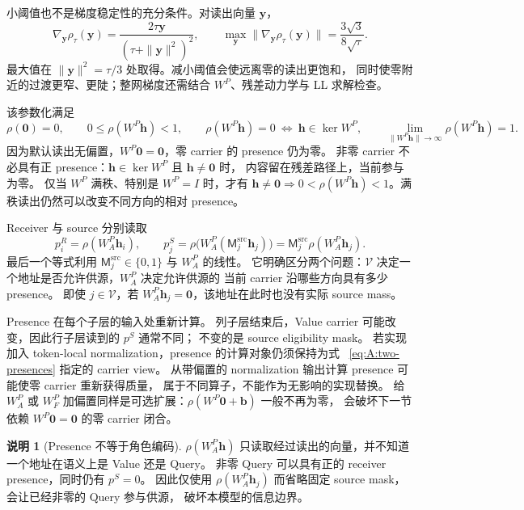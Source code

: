 \documentclass[11pt,UTF8,fontset=fandol]{ctexart}
\numberwithin{equation}{section}
\theoremstyle{definition}
\newtheorem{remark}[definition]{说明}
\newcommand{\Vset}{\mathcal V}
\begin{document}
小阈值也不是梯度稳定性的充分条件。对读出向量 $\bm y$，
\begin{equation}
 \nabla_{\bm y}\rho_\tau(\bm y)
 =\frac{2\tau\bm y}{(\tau+\|\bm y\|^2)^2},\qquad
 \max_{\bm y}\|\nabla_{\bm y}\rho_\tau(\bm y)\|
 =\frac{3\sqrt3}{8\sqrt\tau}.
 \label{v53:eq:presence-derivative-scale}
\end{equation}
最大值在 $\|\bm y\|^2=\tau/3$ 处取得。减小阈值会使远离零的读出更饱和，
同时使零附近的过渡更窄、更陡；整网梯度还需结合 $W^{P}$、残差动力学与 LL 求解检查。

该参数化满足
\begin{equation}
 \rho(\bm0)=0,
 \qquad
 0\le\rho(W^{P}\bm h)<1,
 \qquad
 \rho(W^{P}\bm h)=0\ \Longleftrightarrow\ \bm h\in\ker W^{P},
 \qquad
 \lim_{\|W^{P}\bm h\|\to\infty}\rho(W^{P}\bm h)=1.
 \label{eq:A:presence-properties}
\end{equation}
因为默认读出无偏置，$W^{P}\bm0=\bm0$，零 carrier 的 presence 仍为零。
非零 carrier 不必具有正 presence：$\bm h\in\ker W^{P}$ 且 $\bm h\ne\bm0$ 时，
内容留在残差路径上，当前参与为零。
仅当 $W^{P}$ 满秩、特别是 $W^{P}=I$ 时，才有
$\bm h\ne\bm0\Rightarrow 0<\rho(W^{P}\bm h)<1$。满秩读出仍然可以改变不同方向的相对 presence。

Receiver 与 source 分别读取
\begin{equation}
  p_i^R=\rho(W_A^{P}\bm h_i),
  \qquad
  p_j^S=\rho\bigl(W_A^{P}(\mathsf M_j^{\mathrm{src}}\bm h_j)\bigr)
       =\mathsf M_j^{\mathrm{src}}\rho(W_A^{P}\bm h_j).
  \label{eq:A:two-presences}
\end{equation}\begingroup\makeatletter\protected@edef\@currentlabel{\p@equation\theequation}\label{front:eq:presence}\endgroup
最后一个等式利用 $\mathsf M_j^{\mathrm{src}}\in\{0,1\}$ 与 $W_A^{P}$ 的线性。
它明确区分两个问题：$\Vset$ 决定一个地址是否允许供源，$W_A^{P}$ 决定允许供源的
当前 carrier 沿哪些方向具有多少 presence。
即使 $j\in\Vset$，若 $W_A^{P}\bm h_j=\bm0$，该地址在此时也没有实际 source mass。

Presence 在每个子层的输入处重新计算。
列子层结束后，Value carrier 可能改变，因此行子层读到的 $p^S$ 通常不同；
不变的是 source eligibility mask。
若实现加入 token-local normalization，presence 的计算对象仍须保持为式
~\eqref{eq:A:two-presences} 指定的 carrier view。
从带偏置的 normalization 输出计算 presence 可能使零 carrier 重新获得质量，
属于不同算子，不能作为无影响的实现替换。
给 $W_A^{P}$ 或 $W_F^{P}$ 加偏置同样是可选扩展：$\rho(W^{P}\bm0+\bm b)$ 一般不再为零，
会破坏下一节依赖 $W^{P}\bm0=\bm0$ 的零 carrier 闭合。

\begin{remark}[Presence 不等于角色编码]
$\rho(W_A^{P}\bm h)$ 只读取经过读出的向量，并不知道一个地址在语义上是 Value 还是 Query。
非零 Query 可以具有正的 receiver presence，同时仍有 $p^S=0$。
因此仅使用 $\rho(W_A^{P}\bm h_j)$ 而省略固定 source mask，会让已经非零的 Query 参与供源，
破坏本模型的信息边界。
\end{remark}
\end{document}
